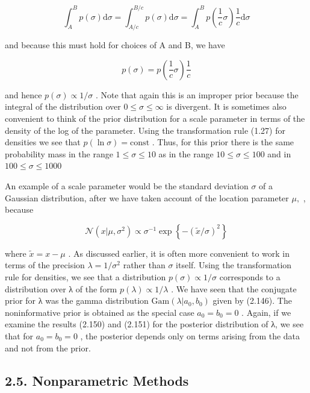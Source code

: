 \documentclass[
  10
]{article}
\begin{document}
\[
\int_ {A} ^ {B} p (\sigma) \mathrm{d} \sigma = \int_ {A / c} ^ {B / c} p (\sigma) \mathrm{d} \sigma = \int_ {A} ^ {B} p \left(\frac {1}{c} \sigma\right) \frac {1}{c} \mathrm{d} \sigma\tag{2.238}
\]

and because this must hold for choices of A and B, we have

\[
p (\sigma) = p \left(\frac {1}{c} \sigma\right) \frac {1}{c}\tag{2.239}
\]

and hence \(p ( \sigma ) \propto 1 / \sigma\) . Note that again this is
an improper prior because the integral of the distribution over
\(0 \leqslant \sigma \leqslant \infty\) is divergent. It is sometimes
also convenient to think of the prior distribution for a scale parameter
in terms of the density of the log of the parameter. Using the
transformation rule (1.27) for densities we see that
\(p ( \ln \sigma ) = \mathrm { c o n s t }\) . Thus, for this prior
there is the same probability mass in the range
\(1 \leqslant \sigma \leqslant 1 0\) as in the range
\(1 0 \leqslant \sigma \leqslant 1 0 0\) and in
\(1 0 0 \leqslant \sigma \leqslant 1 0 0 0\)

An example of a scale parameter would be the standard deviation
\(\sigma\) of a Gaussian distribution, after we have taken account of
the location parameter \(\mu ,\) , because

\[
\mathcal {N} (x | \mu , \sigma^ {2}) \propto \sigma^ {- 1} \exp \left\{- (\widetilde {x} / \sigma) ^ {2} \right\}\tag{2.240}
\]

where \({ \widetilde { x } } = x - \mu\) . As discussed earlier, it is
often more convenient to work in terms of the precision
\(\lambda = 1 / \sigma ^ { 2 }\) rather than \(\sigma\) itself. Using
the transformation rule for densities, we see that a distribution
\(p ( \sigma ) \propto 1 / \sigma\) corresponds to a distribution over λ
of the form \(p ( \lambda ) \propto 1 / \lambda\) . We have seen that
the conjugate prior for λ was the gamma distribution
\(\mathrm { G a m } ( \lambda | a _ { 0 } , b _ { 0 } )\) given by
(2.146). The noninformative prior is obtained as the special case
\(a _ { 0 } = b _ { 0 } = 0\) . Again, if we examine the results (2.150)
and (2.151) for the posterior distribution of λ, we see that for
\(a _ { 0 } = b _ { 0 } = 0\) , the posterior depends only on terms
arising from the data and not from the prior.

\subsection{2.5. Nonparametric Methods}\label{nonparametric-methods}
\end{document}
